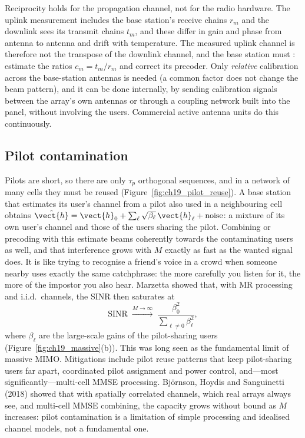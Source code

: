 Reciprocity holds for the propagation channel, not for the radio hardware. The uplink measurement
includes the base station's receive chains $r_m$ and the downlink sees its transmit chains $t_m$,
and these differ in gain and phase from antenna to antenna and drift with temperature. The
measured uplink channel is therefore not the transpose of the downlink channel, and the base
station must : estimate the ratios $c_m=t_m/r_m$ and correct its precoder. Only
\emph{relative} calibration across the base-station antennas is needed (a common factor does not
change the beam pattern), and it can be done internally, by sending calibration signals between the
array's own antennas or through a coupling network built into the panel, without involving the
users. Commercial active antenna units do this continuously.

\subsection{Pilot contamination}

Pilots are short, so there are only $\tau_p$ orthogonal sequences, and in a network of many cells
they must be reused (Figure~\ref{fig:ch19_pilot_reuse}). A base station that estimates its user's
channel from a pilot also used in a neighbouring cell obtains
$\hat{\vect{h}}=\vect{h}_0+\sum_\ell\sqrt{\beta_\ell}\,\vect{h}_\ell+\text{noise}$: a mixture of its
own user's channel and those of the users sharing the pilot. Combining or precoding with this
estimate beams coherently towards the contaminating users as well, and that interference grows with
$M$ exactly as fast as the wanted signal does. It is like trying to recognise a friend's voice in a
crowd when someone nearby uses exactly the same catchphrase: the more carefully you listen for it,
the more of the impostor you also hear. Marzetta showed that, with MR processing and i.i.d.\
channels, the SINR then saturates at
\begin{equation}
\text{SINR}\;\xrightarrow{M\to\infty}\;\frac{\beta_0^2}{\sum_{\ell\ne0}\beta_\ell^2},
\end{equation}
where $\beta_\ell$ are the large-scale gains of the pilot-sharing users
(Figure~\ref{fig:ch19_massive}(b)). This \term{pilot contamination} was long seen as the fundamental
limit of massive MIMO. Mitigations include pilot reuse patterns that keep pilot-sharing users far
apart, coordinated pilot assignment and power control, and---most significantly---multi-cell MMSE
processing. Bj\"ornson, Hoydis and Sanguinetti (2018) showed that with spatially correlated channels,
which real arrays always see, and multi-cell MMSE combining, the capacity grows without bound as $M$
increases: pilot contamination is a limitation of simple processing and idealised channel models,
not a fundamental one.

